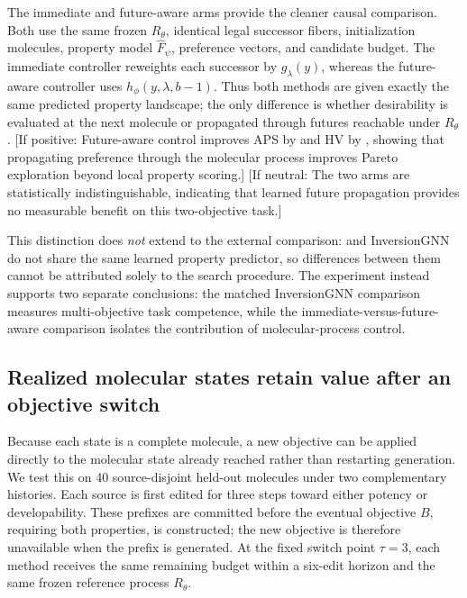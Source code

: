 The immediate and future-aware \method{} arms provide the cleaner causal comparison. Both use the same frozen $R_\theta$, identical legal successor fibers, initialization molecules, property model $\widehat F_\psi$, preference vectors, and candidate budget. The immediate controller reweights each successor by $g_\lambda(y)$, whereas the future-aware controller uses $h_\phi(y,\lambda,b-1)$. Thus both methods are given exactly the same predicted property landscape; the only difference is whether desirability is evaluated at the next molecule or propagated through futures reachable under $R_\theta$. {\color{red}[If positive: Future-aware control improves APS by \XXX{} and HV by \XXX{}, showing that propagating preference through the molecular process improves Pareto exploration beyond local property scoring.] [If neutral: The two arms are statistically indistinguishable, indicating that learned future propagation provides no measurable benefit on this two-objective task.]}

This distinction does \emph{not} extend to the external comparison: \method{} and InversionGNN do not share the same learned property predictor, so differences between them cannot be attributed solely to the search procedure. The experiment instead supports two separate conclusions: the matched InversionGNN comparison measures multi-objective task competence, while the immediate-versus-future-aware \method{} comparison isolates the contribution of molecular-process control.

\subsection{Realized molecular states retain value after an objective switch}
\label{sec:exp-retarget}

Because each \method{} state is a complete molecule, a new objective can be applied directly to the molecular state already reached rather than restarting generation. We test this on 40 source-disjoint held-out molecules under two complementary histories. Each source is first edited for three steps toward either potency or developability. These prefixes are committed before the eventual objective $B$, requiring both properties, is constructed; the new objective is therefore unavailable when the prefix is generated. At the fixed switch point $\tau=3$, each method receives the same remaining budget within a six-edit horizon and the same frozen reference process $R_\theta$.

